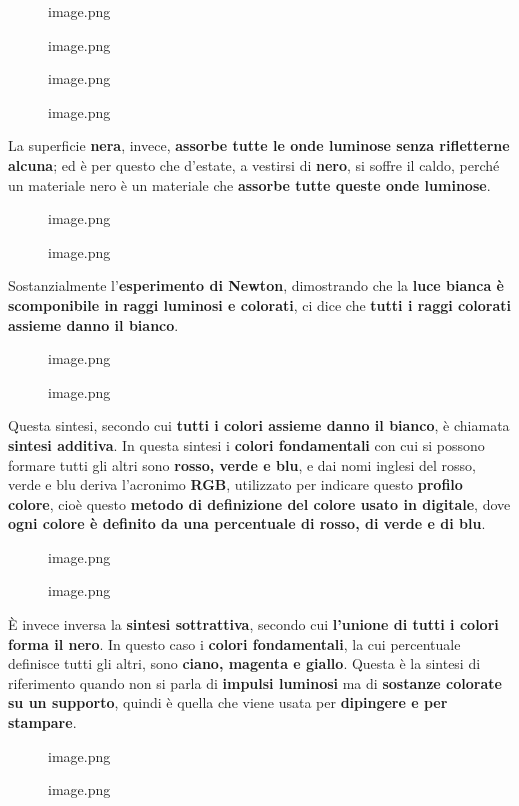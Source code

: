 \documentclass[
]{article}
\begin{document}
\begin{figure}
\centering
{image.png}
\caption{image.png}
\end{figure}

\begin{figure}
\centering
{image.png}
\caption{image.png}
\end{figure}

La superficie \textbf{nera}, invece, \textbf{assorbe tutte le onde luminose senza rifletterne alcuna}; ed è per questo che d'estate, a vestirsi di \textbf{nero}, si soffre il caldo, perché un materiale nero è un materiale che \textbf{assorbe tutte queste onde luminose}.

\begin{figure}
\centering
{image.png}
\caption{image.png}
\end{figure}

Sostanzialmente l'\textbf{esperimento di Newton}, dimostrando che la \textbf{luce bianca è scomponibile in raggi luminosi e colorati}, ci dice che \textbf{tutti i raggi colorati assieme danno il bianco}.

\begin{figure}
\centering
{image.png}
\caption{image.png}
\end{figure}

Questa sintesi, secondo cui \textbf{tutti i colori assieme danno il bianco}, è chiamata \textbf{sintesi additiva}. In questa sintesi i \textbf{colori fondamentali} con cui si possono formare tutti gli altri sono \textbf{rosso, verde e blu}, e dai nomi inglesi del rosso, verde e blu deriva l'acronimo \textbf{RGB}, utilizzato per indicare questo \textbf{profilo colore}, cioè questo \textbf{metodo di definizione del colore usato in digitale}, dove \textbf{ogni colore è definito da una percentuale di rosso, di verde e di blu}.

\begin{figure}
\centering
{image.png}
\caption{image.png}
\end{figure}

È invece inversa la \textbf{sintesi sottrattiva}, secondo cui \textbf{l'unione di tutti i colori forma il nero}. In questo caso i \textbf{colori fondamentali}, la cui percentuale definisce tutti gli altri, sono \textbf{ciano, magenta e giallo}. Questa è la sintesi di riferimento quando non si parla di \textbf{impulsi luminosi} ma di \textbf{sostanze colorate su un supporto}, quindi è quella che viene usata per \textbf{dipingere e per stampare}.

\begin{figure}
\centering
{image.png}
\caption{image.png}
\end{figure}
\end{document}

